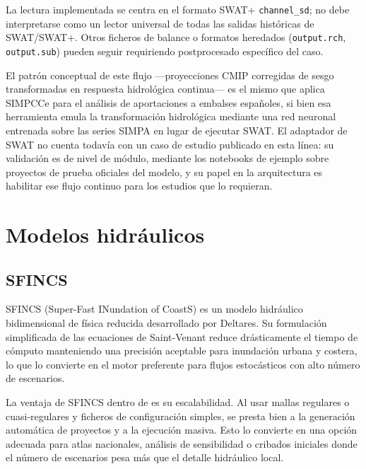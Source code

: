 La lectura implementada se centra en el formato SWAT+ \texttt{channel\_sd}; no debe interpretarse como un lector universal de todas las salidas históricas de SWAT/SWAT+. Otros ficheros de balance o formatos heredados (\texttt{output.rch}, \texttt{output.sub}) pueden seguir requiriendo postprocesado específico del caso.

El patrón conceptual de este flujo ---proyecciones CMIP corregidas de sesgo transformadas en respuesta hidrológica continua--- es el mismo que aplica SIMPCCe \parencite{navas2025simpce} para el análisis de aportaciones a embalses españoles, si bien esa herramienta emula la transformación hidrológica mediante una red neuronal entrenada sobre las series SIMPA en lugar de ejecutar SWAT. El adaptador de SWAT no cuenta todavía con un caso de estudio publicado en esta línea: su validación es de nivel de módulo, mediante los notebooks de ejemplo sobre proyectos de prueba oficiales del modelo, y su papel en la arquitectura es habilitar ese flujo continuo para los estudios que lo requieran.

\section{Modelos hidráulicos}

\subsection{SFINCS}

SFINCS \parencite{leijnse2021sfincs} (Super-Fast INundation of CoastS) es un modelo hidráulico bidimensional de física reducida desarrollado por Deltares. Su formulación simplificada de las ecuaciones de Saint-Venant reduce drásticamente el tiempo de cómputo manteniendo una precisión aceptable para inundación urbana y costera, lo que lo convierte en el motor preferente para flujos estocásticos con alto número de escenarios.

La ventaja de SFINCS dentro de \hydra es su escalabilidad. Al usar mallas regulares o cuasi-regulares y ficheros de configuración simples, se presta bien a la generación automática de proyectos y a la ejecución masiva. Esto lo convierte en una opción adecuada para atlas nacionales, análisis de sensibilidad o cribados iniciales donde el número de escenarios pesa más que el detalle hidráulico local.


